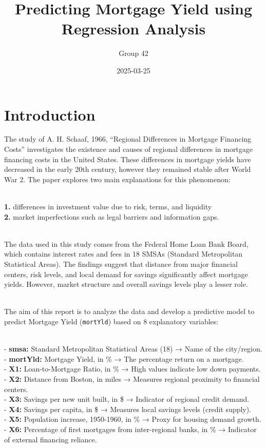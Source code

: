\documentclass[
  12pt,
]{article}
\title{Predicting Mortgage Yield using Regression Analysis}
\author{Group 42}
\date{2025-03-25}
\begin{document}
\maketitle

\section{Introduction}\label{introduction}

The study of A. H. Schaaf, 1966, ``Regional Differences in Mortgage
Financing Costs'' investigates the existence and causes of regional
differences in mortgage financing costs in the United States. These
differences in mortgage yields have decreased in the early 20th century,
however they remained stable after World War 2. The paper explores two
main explanations for this phenomenon:\\
\strut \\
\textbf{1.} differences in investment value due to risk, terms, and
liquidity\\
\textbf{2.} market imperfections such as legal barriers and information
gaps.\\
\strut \\
The data used in this study comes from the Federal Home Loan Bank Board,
which contains interest rates and fees in 18 SMSAs (Standard
Metropolitan Statistical Areas). The findings suggest that distance from
major financial centers, risk levels, and local demand for savings
significantly affect mortgage yields. However, market structure and
overall savings levels play a lesser role.\\
\strut \\
The aim of this report is to analyze the data and develop a predictive
model to predict Mortgage Yield (\texttt{mortYld}) based on 8
explanatory variables:\\
\strut \\
- \textbf{smsa:} Standard Metropolitan Statistical Areas (18) → Name of
the city/region.\\
- \textbf{mortYld:} Mortgage Yield, in \% → The percentage return on a
mortgage.\\
- \textbf{X1:} Loan-to-Mortgage Ratio, in \% → High values indicate low
down payments.\\
- \textbf{X2:} Distance from Boston, in miles → Measures regional
proximity to financial centers.\\
- \textbf{X3:} Savings per new unit built, in \$ → Indicator of regional
credit demand.\\
- \textbf{X4:} Savings per capita, in \$ → Measures local savings levels
(credit supply).\\
- \textbf{X5:} Population increase, 1950-1960, in \% → Proxy for housing
demand growth.\\
- \textbf{X6:} Percentage of first mortgages from inter-regional banks,
in \% → Indicator of external financing reliance.\\
\end{document}
